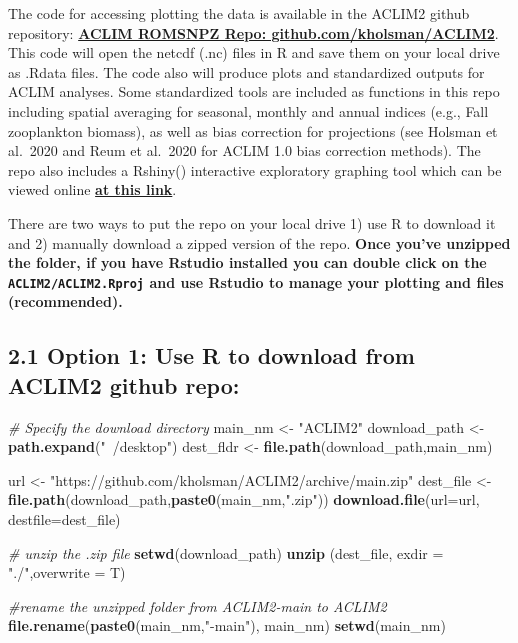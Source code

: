 \documentclass[
]{article}
\newenvironment{Shaded}{\begin{snugshade}}{\end{snugshade}}
\newcommand{\CommentTok}[1]{\textcolor[rgb]{0.56,0.35,0.01}{\textit{#1}}}
\newcommand{\DataTypeTok}[1]{\textcolor[rgb]{0.13,0.29,0.53}{#1}}
\newcommand{\KeywordTok}[1]{\textcolor[rgb]{0.13,0.29,0.53}{\textbf{#1}}}
\newcommand{\NormalTok}[1]{#1}
\newcommand{\StringTok}[1]{\textcolor[rgb]{0.31,0.60,0.02}{#1}}
\begin{document}
The code for accessing plotting the data is available in the ACLIM2
github repository:
\href{https://github.com/kholsman/ACLIM2}{\textbf{ACLIM ROMSNPZ Repo:
github.com/kholsman/ACLIM2}}. This code will open the netcdf (.nc) files
in R and save them on your local drive as .Rdata files. The code also
will produce plots and standardized outputs for ACLIM analyses. Some
standardized tools are included as functions in this repo including
spatial averaging for seasonal, monthly and annual indices (e.g., Fall
zooplankton biomass), as well as bias correction for projections (see
Holsman et al.~2020 and Reum et al.~2020 for ACLIM 1.0 bias correction
methods). The repo also includes a Rshiny() interactive exploratory
graphing tool which can be viewed online
\href{https://kholsman.shinyapps.io/aclim/}{\textbf{at this link}}.

There are two ways to put the repo on your local drive 1) use R to
download it and 2) manually download a zipped version of the repo.
\textbf{Once you've unzipped the folder, if you have Rstudio installed
you can double click on the \texttt{ACLIM2/ACLIM2.Rproj} and use Rstudio
to manage your plotting and files (recommended).}

\hypertarget{option-1-use-r-to-download-from-aclim2-github-repo}{%
\subsection{2.1 Option 1: Use R to download from ACLIM2 github
repo:}\label{option-1-use-r-to-download-from-aclim2-github-repo}}

\begin{Shaded}
\begin{Highlighting}[]
    \CommentTok{# Specify the download directory}
\NormalTok{    main_nm       <-}\StringTok{ "ACLIM2"}
\NormalTok{    download_path <-}\StringTok{ }\KeywordTok{path.expand}\NormalTok{(}\StringTok{"~/desktop"}\NormalTok{)}
\NormalTok{    dest_fldr     <-}\StringTok{ }\KeywordTok{file.path}\NormalTok{(download_path,main_nm)}
    
\NormalTok{    url           <-}\StringTok{ "https://github.com/kholsman/ACLIM2/archive/main.zip"}
\NormalTok{    dest_file     <-}\StringTok{ }\KeywordTok{file.path}\NormalTok{(download_path,}\KeywordTok{paste0}\NormalTok{(main_nm,}\StringTok{".zip"}\NormalTok{))}
    \KeywordTok{download.file}\NormalTok{(}\DataTypeTok{url=}\NormalTok{url, }\DataTypeTok{destfile=}\NormalTok{dest_file)}
    
    \CommentTok{# unzip the .zip file}
    \KeywordTok{setwd}\NormalTok{(download_path)}
    \KeywordTok{unzip}\NormalTok{ (dest_file, }\DataTypeTok{exdir =} \StringTok{"./"}\NormalTok{,}\DataTypeTok{overwrite =}\NormalTok{ T)}
    
    \CommentTok{#rename the unzipped folder from ACLIM2-main to ACLIM2}
    \KeywordTok{file.rename}\NormalTok{(}\KeywordTok{paste0}\NormalTok{(main_nm,}\StringTok{"-main"}\NormalTok{), main_nm)}
    \KeywordTok{setwd}\NormalTok{(main_nm)}
\end{Highlighting}
\end{Shaded}
\end{document}
